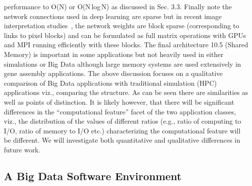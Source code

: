 \documentclass{acm_proc_article-sp}
\begin{document}
performance to O(N) or O(N\,log\,N) as discussed in Sec. 3.3. Finally note the
network connections used in deep learning are sparse but in recent image
interpretation studies~\cite{b7}, the network weights are block sparse
(corresponding to links to pixel blocks) and can be formulated as full matrix
operations with GPUs and MPI running efficiently with these blocks. The final
architecture 10.5 (Shared Memory) is important in some applications but not
heavily used in either simulations or Big Data although large memory systems
are used extensively in gene assembly applications. The above discussion
focuses on a qualitative comparison of Big Data applications with traditional
simulation (HPC) applications viz., comparing the structure. As can be seen
there are similarities as well as points of distinction. It is likely however,
that there will be significant differences in the ``computational
feature'' facet of the two application classes, viz., the distribution of the
values of different ratios (e.g., ratio of computing to I/O, ratio of memory to
I/O etc.) characterizing the computational feature will be different. We will
investigate both quantitative and qualitative differences in future work.


\subsection{A Big Data Software Environment}


\end{document}
